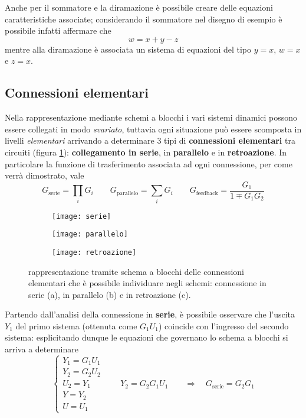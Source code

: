	Anche per il sommatore e la diramazione è possibile creare delle equazioni caratteristiche associate; considerando il sommatore nel disegno di esempio è possibile infatti affermare che 
	\[ w = x + y -z \]
	mentre alla diramazione è associata un sistema di equazioni del tipo $y=x$, $w = x$ e $z = x$.
	
	\subsection{Connessioni elementari}
		
		\begin{concetto}
			Nella rappresentazione mediante schemi a blocchi i vari sistemi dinamici possono essere collegati in modo \textit{svariato}, tuttavia ogni situazione può essere scomposta in livelli \textit{elementari} arrivando a determinare 3 tipi di \textbf{connessioni elementari} tra circuiti (figura \ref{fig:int:connesioni-elementari}): \textbf{collegamento in serie}, in \textbf{parallelo} e in \textbf{retroazione}. In particolare la funzione di trasferimento associata ad ogni connessione, per come verrà dimostrato, vale
			\begin{equation}
				G_\textrm{serie} =  \prod_i G_i \qquad G_\textrm{parallelo} = \sum_i G_i \qquad G_\textrm{feedback} = \frac{G_1}{1\mp G_1G_2}
			\end{equation}
		\end{concetto}
	
		\begin{figure}[bht]
			\centering
			\begin{subfigure}{0.325\linewidth}
				\centering \texttt{[image: serie]} \caption{}
			\end{subfigure}
			\begin{subfigure}{0.325\linewidth}
				\centering \texttt{[image: parallelo]} \caption{}
			\end{subfigure}
			\begin{subfigure}{0.325\linewidth}
				\centering \texttt{[image: retroazione]} \caption{}
			\end{subfigure}
			\caption{rappresentazione tramite schema a blocchi delle connessioni elementari che è possibile individuare negli schemi: connessione in serie (a), in parallelo (b) e in retroazione (c).}
			\label{fig:int:connesioni-elementari}
		\end{figure}
		
		Partendo dall'analisi della connessione in \textbf{serie}, è possibile osservare che l'uscita $Y_1$ del primo sistema (ottenuta come $G_1U_1$) coincide con l'ingresso del secondo sistema: esplicitando dunque le equazioni che governano lo schema a blocchi si arriva a determinare
		\[ \begin{cases}
			Y_1 =G_1U_1 \\
			Y_2 =G_2U_2 \\
			U_2 = Y_1 \\ Y =Y_2 \\ U=U_1 
		\end{cases} \qquad Y_2 = G_2G_1U_1 \qquad \Rightarrow \quad G_\textrm{serie} = G_2G_1 \]
		
